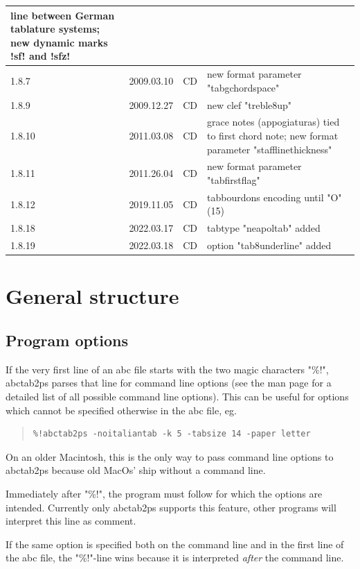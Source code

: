 \documentclass[a4paper]{article}
\begin{document}
\begin{center}
\begin{longtable}{|l|l|l|p{8cm}|}
    line between German tablature systems; new dynamic marks !sf! and !sfz!
    \\ \hline
1.8.7 & 2009.03.10 & CD & new format parameter "tabgchordspace" \\ \hline
1.8.9 & 2009.12.27 & CD & new clef "treble8up" \\ \hline
1.8.10 & 2011.03.08 & CD & grace notes (appogiaturas) tied to first chord note;
    new format parameter "stafflinethickness" \\ \hline
1.8.11 & 2011.26.04 & CD & new format parameter "tabfirstflag"
    \\ \hline
1.8.12 & 2019.11.05 & CD & tabbourdons encoding until "O" (15)
    \\ \hline
1.8.18 & 2022.03.17 & CD & tabtype "neapoltab" added
    \\ \hline
1.8.19 & 2022.03.18 & CD & option "tab8underline" added
    \\ \hline
\end{longtable}
\end{center}

\section{General structure}

\subsection{Program options}
If the very first line of an abc file starts with the two magic 
characters "\%!", abctab2ps parses that line for command
line options (see the man page for a detailed list of all possible 
command line options). This can be useful for options which cannot
be specified otherwise in the abc file, eg.

\begin{quote}
\begin{verbatim}
%!abctab2ps -noitaliantab -k 5 -tabsize 14 -paper letter
\end{verbatim}
\end{quote}

On an older Macintosh, this is the only way to pass command line options
to abctab2ps because old MacOs' ship without a command line.
\par
Immediately after "\%!", the program must follow for which the 
options are intended. Currently only abctab2ps supports this
feature, other programs will interpret this line as comment.
\par
If the same option is specified both on the command line and
in the first line of the abc file, the "\%!"-line wins because
it is interpreted {\it after} the command line.
\end{document}
